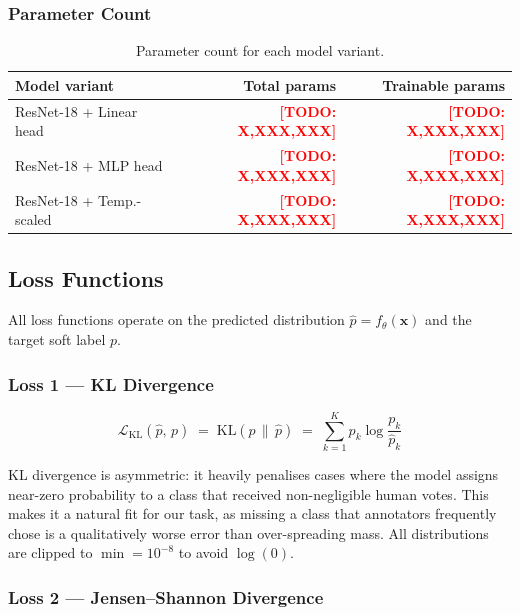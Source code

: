 \documentclass[11pt,a4paper]{article}
\newcommand{\KL}{\mathrm{KL}}
\newcommand{\todo}[1]{\textcolor{red}{\textbf{[TODO: #1]}}}
\begin{document}
\subsubsection{Parameter Count}

\begin{table}[H]
\centering
\caption{Parameter count for each model variant.}
\label{tab:params}
\begin{tabular}{lrr}
\toprule
\textbf{Model variant} & \textbf{Total params} & \textbf{Trainable params} \\
\midrule
ResNet-18 + Linear head     & \todo{X,XXX,XXX} & \todo{X,XXX,XXX} \\
ResNet-18 + MLP head        & \todo{X,XXX,XXX} & \todo{X,XXX,XXX} \\
ResNet-18 + Temp.-scaled    & \todo{X,XXX,XXX} & \todo{X,XXX,XXX} \\
\bottomrule
\end{tabular}
\end{table}

\subsection{Loss Functions}

All loss functions operate on the predicted distribution
$\hat{p} = f_\theta(\mathbf{x})$ and the target soft label $p$.

\subsubsection{Loss 1 — KL Divergence}

\begin{equation}
  \mathcal{L}_{\KL}(\hat{p},\, p) \;=\;
  \KL(p \,\|\, \hat{p}) \;=\;
  \sum_{k=1}^{K} p_k \log \frac{p_k}{\hat{p}_k}
  \label{eq:kl}
\end{equation}

KL divergence is asymmetric: it heavily penalises cases where the model
assigns near-zero probability to a class that received non-negligible human
votes.
This makes it a natural fit for our task, as missing a class that annotators
frequently chose is a qualitatively worse error than over-spreading mass.
All distributions are clipped to $\min = 10^{-8}$ to avoid $\log(0)$.

\subsubsection{Loss 2 — Jensen--Shannon Divergence}
\end{document}
